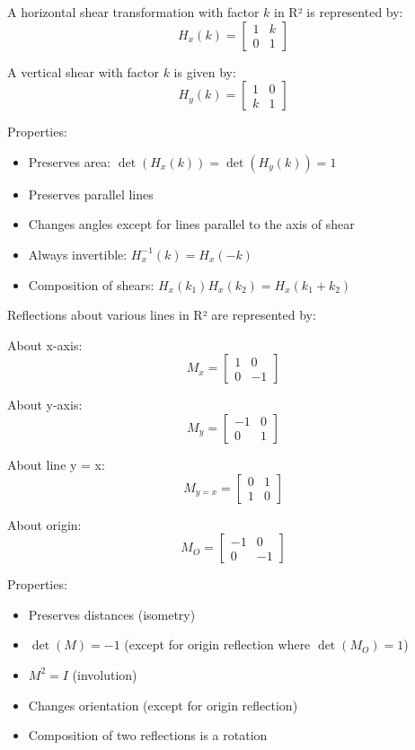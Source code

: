 \begin{definition}
A horizontal shear transformation with factor $k$ in R² is represented by:
$$H_x(k) = \begin{bmatrix}
1 & k \\
0 & 1
\end{bmatrix}$$

A vertical shear with factor $k$ is given by:
$$H_y(k) = \begin{bmatrix}
1 & 0 \\
k & 1
\end{bmatrix}$$

Properties:
\begin{itemize}
    \item Preserves area: $\det(H_x(k)) = \det(H_y(k)) = 1$
    \item Preserves parallel lines
    \item Changes angles except for lines parallel to the axis of shear
    \item Always invertible: $H_x^{-1}(k) = H_x(-k)$
    \item Composition of shears: $H_x(k_1)H_x(k_2) = H_x(k_1 + k_2)$
\end{itemize}
\end{definition}

\begin{definition}
Reflections about various lines in R² are represented by:

About x-axis:
$$M_x = \begin{bmatrix}
1 & 0 \\
0 & -1
\end{bmatrix}$$

About y-axis:
$$M_y = \begin{bmatrix}
-1 & 0 \\
0 & 1
\end{bmatrix}$$

About line y = x:
$$M_{y=x} = \begin{bmatrix}
0 & 1 \\
1 & 0
\end{bmatrix}$$

About origin:
$$M_O = \begin{bmatrix}
-1 & 0 \\
0 & -1
\end{bmatrix}$$

Properties:
\begin{itemize}
    \item Preserves distances (isometry)
    \item $\det(M) = -1$ (except for origin reflection where $\det(M_O) = 1$)
    \item $M^2 = I$ (involution)
    \item Changes orientation (except for origin reflection)
    \item Composition of two reflections is a rotation
\end{itemize}
\end{definition}

